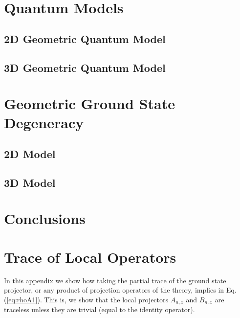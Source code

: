 \documentclass[%
nofootinbib,
 amsmath,amssymb,
aps,
]{revtex4-1}
\theoremstyle{plain}%
\theoremstyle{definition}
\theoremstyle{remark}
\begin{document}
\section{Quantum Models }\label{sec:QModels}
\subsection{2D Geometric Quantum Model }\label{sec:2Dmodel}
\subsection{3D Geometric Quantum Model }\label{sec:3Dmodel}

 
\section{Geometric Ground State Degeneracy}\label{sec:G-GSD}
\subsection{2D Model}
\subsection{3D Model}

\section{Conclusions}\label{sec:Remarks}

\appendix






\section{Trace of Local Operators}\label{sec:app2}
In this appendix we show how taking the partial trace of the ground state projector, or any product of projection operators of the theory, implies in Eq.(\ref{eq:rhoA1}). This is, we show that the local projectors \(A_{n,x}\) and \(B_{n,x}\) are traceless unless they are trivial (equal to the identity operator).
\end{document}
